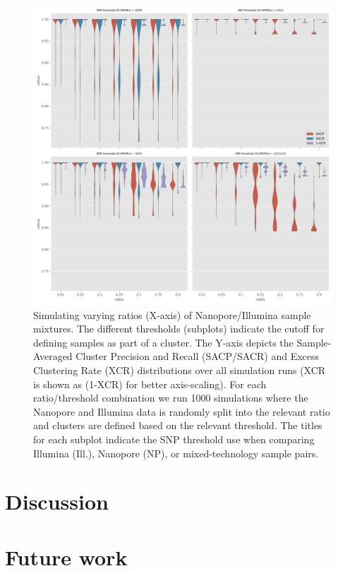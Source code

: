 \begin{figure}
\begin{center}
\includegraphics[width=0.70\columnwidth]{Chapter2/Figs/mixed_simulations.png}
\caption{{Simulating varying ratios (X-axis) of Nanopore/Illumina sample mixtures.
The different thresholds (subplots) indicate the cutoff for defining
samples as part of a cluster. The Y-axis depicts the Sample-Averaged
Cluster Precision and Recall (SACP/SACR) and Excess Clustering Rate
(XCR) distributions over all simulation runs (XCR is shown as (1-XCR)
for better axis-scaling). For each ratio/threshold combination we run
1000 simulations where the Nanopore and Illumina data is randomly split
into the relevant ratio and clusters are defined based on the relevant
threshold. The titles for each subplot indicate the SNP threshold use
when comparing Illumina (Ill.), Nanopore (NP), or mixed-technology
sample pairs.
{\label{571244}}%
}}
\end{center}
\end{figure}

\section{Discussion}


\section{Future work}


